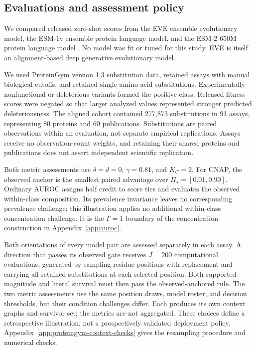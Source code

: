 \documentclass[11pt]{article}
\newcommand{\PSet}{\Pi_\star}
\theoremstyle{remark}
\begin{document}
\subsection{Evaluations and assessment policy}

We compared released zero-shot scores from the EVE ensemble evolutionary
model, the ESM-1v ensemble protein language model, and the ESM-2 650M protein
language model \cite{frazer2021eve,meier2021esm1v,lin2023esm2}. No model was
fit or tuned for this study. EVE is itself an alignment-based deep generative
evolutionary model.

We used ProteinGym version 1.3 substitution data, retained assays with manual
biological cutoffs, and retained single amino-acid substitutions.
Experimentally nonfunctional or deleterious variants formed the positive class.
Released fitness scores were negated so that larger analyzed values represented
stronger predicted deleteriousness. The aligned cohort contained 277,873
substitutions in 91 assays, representing 80 proteins and 60 publications.
Substitutions are paired observations within an evaluation, not separate
empirical replications. Assays receive no observation-count weights, and
retaining their shared proteins and publications does not assert independent
scientific replication.

Both metric assessments use $\delta=d=0$, $\gamma=0.81$, and $K_C=2$.
For CNAP, the observed anchor is the smallest paired advantage over
$\PSet=[0.01,0.90]$. Ordinary AUROC assigns half credit to score ties and
evaluates the observed within-class composition. Its prevalence invariance
leaves no corresponding prevalence challenge; this illustration applies no
additional within-class concentration challenge. It is the $\Gamma=1$
boundary of the concentration construction in Appendix~\ref{app:auroc}.

Both orientations of every model pair are assessed separately in each assay.
A direction that passes its observed gate receives $J=200$ computational
evaluations, generated by sampling residue positions with replacement and
carrying all retained substitutions at each selected position. Both supported
magnitude and literal survival must then pass the observed-anchored rule.
The two metric assessments use the same position draws, model roster, and
decision thresholds, but their condition challenges differ. Each produces
its own context graphs and survivor set; the metrics are not aggregated.
These choices define a retrospective illustration, not a prospectively
validated deployment policy. Appendix~\ref{app:proteingym-context-checks}
gives the resampling procedure and numerical checks.
\end{document}
